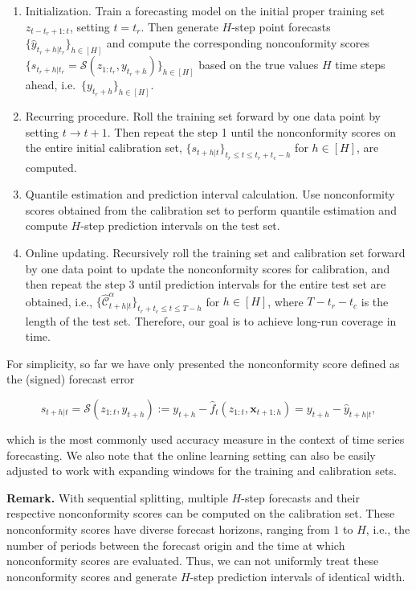 \documentclass[
  11pt,
  a4paper,
]{article}
\theoremstyle{plain}
\theoremstyle{plain}
\theoremstyle{remark}
\begin{document}
\begin{enumerate}
\def\labelenumi{\arabic{enumi}.}
\item
  Initialization. Train a forecasting model on the initial proper
  training set \(z_{t-t_r+1:t}\), setting \(t=t_r\). Then generate
  \(H\)-step point forecasts \(\{\hat{y}_{t_r+h|t_r}\}_{h\in[H]}\) and
  compute the corresponding nonconformity scores
  \(\{s_{t_r+h|t_r}=\mathcal{S}(z_{1:t_r}, y_{t_r+h})\}_{h\in[H]}\)
  based on the true values \(H\) time steps ahead,
  i.e.~\(\{y_{t_r+h}\}_{h\in[H]}\).
\item
  Recurring procedure. Roll the training set forward by one data point
  by setting \(t \rightarrow t+1\). Then repeat the step 1 until the
  nonconformity scores on the entire initial calibration set,
  \(\{s_{t+h|t}\}_{t_r \leq t \leq t_r+t_c-h}\) for \(h\in[H]\), are
  computed.
\item
  Quantile estimation and prediction interval calculation. Use
  nonconformity scores obtained from the calibration set to perform
  quantile estimation and compute \(H\)-step prediction intervals on the
  test set.
\item
  Online updating. Recursively roll the training set and calibration set
  forward by one data point to update the nonconformity scores for
  calibration, and then repeat the step 3 until prediction intervals for
  the entire test set are obtained, i.e.,
  \(\{\hat{\mathcal{C}}_{t+h|t}^{\alpha}\}_{t_r+t_c \leq t \leq T-h}\)
  for \(h \in [H]\), where \(T-t_r-t_c\) is the length of the test set.
  Therefore, our goal is to achieve long-run coverage in time.
\end{enumerate}

For simplicity, so far we have only presented the nonconformity score
defined as the (signed) forecast error

\[
s_{t+h|t}=\mathcal{S}\left(z_{1:t}, y_{t+h}\right):=y_{t+h}-\hat{f}_t\left(z_{1:t},\bm{x}_{t+1:h}\right)=y_{t+h}-\hat{y}_{t+h|t},
\]

which is the most commonly used accuracy measure in the context of time
series forecasting. We also note that the online learning setting can
also be easily adjusted to work with expanding windows for the training
and calibration sets.

\textbf{Remark.} With sequential splitting, multiple \(H\)-step
forecasts and their respective nonconformity scores can be computed on
the calibration set. These nonconformity scores have diverse forecast
horizons, ranging from \(1\) to \(H\), i.e., the number of periods
between the forecast origin and the time at which nonconformity scores
are evaluated. Thus, we can not uniformly treat these nonconformity
scores and generate \(H\)-step prediction intervals of identical width.
\end{document}
